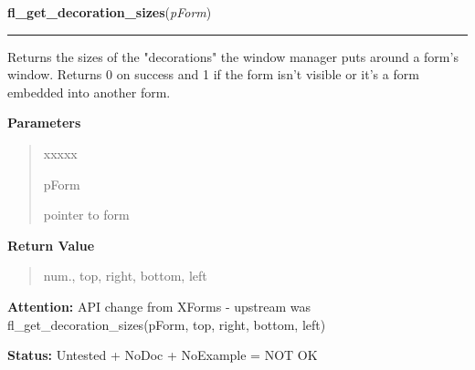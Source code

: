 \hspace{.8\funcindent}\begin{boxedminipage}{\funcwidth}

    \raggedright \textbf{fl\_get\_decoration\_sizes}(\textit{pForm})

    \vspace{-1.5ex}

    \rule{\textwidth}{0.5\fboxrule}
\setlength{\parskip}{2ex}
    Returns the sizes of the "decorations" the window manager puts around a
    form's window. Returns 0 on success and 1 if the form isn't visible or 
    it's a form embedded into another form.

\setlength{\parskip}{1ex}
      \textbf{Parameters}
      \vspace{-1ex}

      \begin{quote}
        \begin{Ventry}{xxxxx}

          \item[pForm]

          pointer to form

        \end{Ventry}

      \end{quote}

      \textbf{Return Value}
    \vspace{-1ex}

      \begin{quote}
      num., top, right, bottom, left

      \end{quote}

\textbf{Attention:} API change from XForms - upstream was fl\_get\_decoration\_sizes(pForm, 
top, right, bottom, left)



\textbf{Status:} Untested + NoDoc + NoExample = NOT OK



    \end{boxedminipage}

    \label{xformslib:library:fl_raise_form}

    \vspace{0.5ex}

